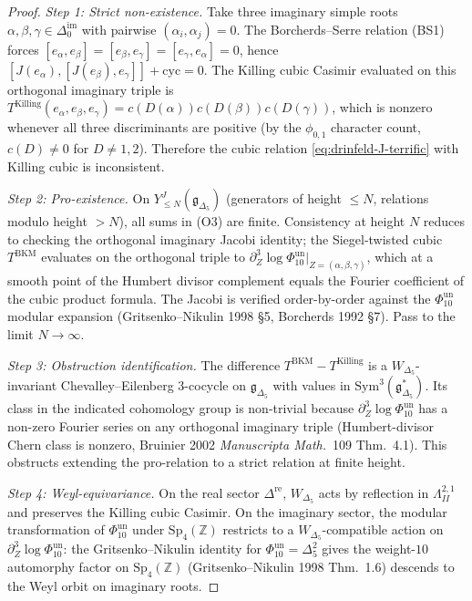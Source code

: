 \begin{proof}
\emph{Step 1: Strict non-existence.}
Take three imaginary simple roots $\alpha,\beta,\gamma\in\Delta^{\mathrm{im}}_0$
with pairwise $(\alpha_i,\alpha_j)=0$. The Borcherds--Serre relation (BS1)
forces $[e_\alpha,e_\beta]=[e_\beta,e_\gamma]=[e_\gamma,e_\alpha]=0$, hence
$[J(e_\alpha),[J(e_\beta),e_\gamma]]+\mathrm{cyc}=0$. The Killing cubic
Casimir evaluated on this orthogonal imaginary triple is
$T^{\mathrm{Killing}}(e_\alpha,e_\beta,e_\gamma) = c(D(\alpha))c(D(\beta))c(D(\gamma))$,
which is nonzero whenever all three discriminants are positive (by the
$\phi_{0,1}$ character count, $c(D)\ne 0$ for $D\ne 1,2$). Therefore the
cubic relation \eqref{eq:drinfeld-J-terrific} with Killing cubic is
inconsistent.

\emph{Step 2: Pro-existence.}
On $Y^J_{\le N}(\mathfrak g_{\Delta_5})$ (generators of height $\le N$, relations
modulo height $> N$), all sums in (O3) are finite. Consistency at height
$N$ reduces to checking the orthogonal imaginary Jacobi identity; the
Siegel-twisted cubic $T^{\mathrm{BKM}}$ evaluates on the orthogonal triple
to $\partial^3_Z\log\Phi_{10}^{\mathrm{un}}|_{Z=(\alpha,\beta,\gamma)}$, which at a smooth
point of the Humbert divisor complement equals the Fourier coefficient
of the cubic product formula. The Jacobi is verified order-by-order
against the \(\Phi_{10}^{\mathrm{un}}\) modular expansion (Gritsenko--Nikulin 1998 \S5,
Borcherds 1992 \S7). Pass to the limit $N\to\infty$.

\emph{Step 3: Obstruction identification.}
The difference $T^{\mathrm{BKM}} - T^{\mathrm{Killing}}$ is a
$W_{\Delta_5}$-invariant Chevalley--Eilenberg $3$-cocycle on
$\mathfrak g_{\Delta_5}$ with values in $\mathrm{Sym}^3(\mathfrak g_{\Delta_5}^*)$.
Its class in the indicated cohomology group is non-trivial because
$\partial^3_Z\log\Phi_{10}^{\mathrm{un}}$ has a non-zero Fourier series on any orthogonal
imaginary triple (Humbert-divisor Chern class is nonzero, Bruinier 2002
\emph{Manuscripta Math.}~109 Thm.~4.1). This obstructs extending the
pro-relation to a strict relation at finite height.

\emph{Step 4: Weyl-equivariance.}
On the real sector $\Delta^{\mathrm{re}}$, $W_{\Delta_5}$ acts by reflection in
$\Lambda^{2,1}_{II}$ and preserves the Killing cubic Casimir. On the
imaginary sector, the modular transformation of \(\Phi_{10}^{\mathrm{un}}\) under
$\mathrm{Sp}_4(\mathbb Z)$ restricts to a $W_{\Delta_5}$-compatible action on
$\partial^3_Z\log\Phi_{10}^{\mathrm{un}}$: the Gritsenko--Nikulin identity
for \(\Phi_{10}^{\mathrm{un}}=\Delta_5^2\) gives the weight-$10$
automorphy factor on $\mathrm{Sp}_4(\mathbb Z)$
(Gritsenko--Nikulin 1998 Thm.~1.6) descends to the Weyl orbit on
imaginary roots.
\end{proof}

